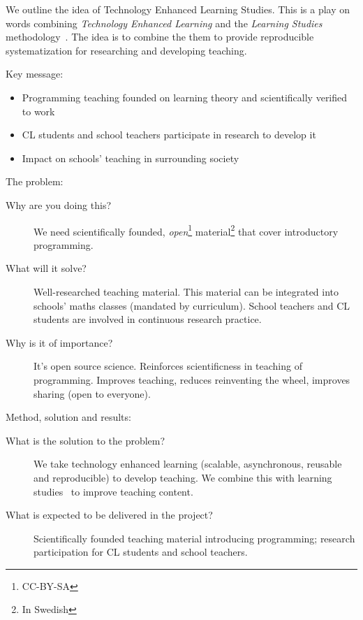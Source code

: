 
We outline the idea of Technology Enhanced Learning Studies.
This is a play on words combining \emph{Technology Enhanced Learning} and the 
\emph{Learning Studies} methodology~\cite{LearningStudy}.
The idea is to combine the them to provide reproducible systematization for 
researching and developing teaching.

Key message:
\begin{itemize}
  \item Programming teaching founded on learning theory and scientifically 
    verified to work

  \item CL students and school teachers participate in research to develop it

  \item Impact on schools' teaching in surrounding society
\end{itemize}

The problem:
\begin{description}
  \item[Why are you doing this?]
    We need scientifically founded, \emph{open}\footnote{CC-BY-SA} 
    material\footnote{In Swedish} that cover introductory programming.

  \item[What will it solve?]
    Well-researched teaching material.
    This material can be integrated into schools’ maths classes (mandated by 
    curriculum).
    School teachers and CL students are involved in continuous research 
    practice.

  \item[Why is it of importance?]
    It's open source science.
    Reinforces scientificness in teaching of programming.
    Improves teaching, reduces reinventing the wheel, improves sharing (open to 
    everyone).
\end{description}

Method, solution and results:
\begin{description}
  \item[What is the solution to the problem?]
    We take technology enhanced learning (scalable, asynchronous, reusable and 
    reproducible) to develop teaching.
    We combine this with learning studies~\cite{LearningStudy} to improve 
    teaching content.

  \item[What is expected to be delivered in the project?]
    Scientifically founded teaching material introducing programming;
    research participation for CL students and school teachers.
\end{description}

